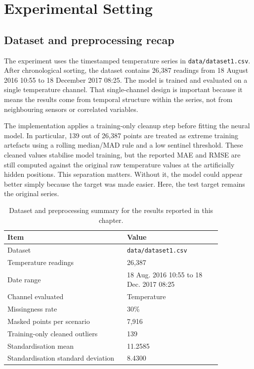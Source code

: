 \section{Experimental Setting}
\label{sec:results-setting}

\subsection{Dataset and preprocessing recap}

The experiment uses the timestamped temperature series in \texttt{data/dataset1.csv}. After chronological sorting, the dataset contains 26,387 readings from 18 August 2016 10:55 to 18 December 2017 08:25. The model is trained and evaluated on a single temperature channel. That single-channel design is important because it means the results come from temporal structure within the series, not from neighbouring sensors or correlated variables.

The implementation applies a training-only cleanup step before fitting the neural model. In particular, 139 out of 26,387 points are treated as extreme training artefacts using a rolling median/MAD rule and a low sentinel threshold. These cleaned values stabilise model training, but the reported MAE and RMSE are still computed against the original raw temperature values at the artificially hidden positions. This separation matters. Without it, the model could appear better simply because the target was made easier. Here, the test target remains the original series.

\begin{table}[ht]
	\centering
	\small
	\begin{tabular}{p{0.48\linewidth}p{0.38\linewidth}}
		\toprule
		\textbf{Item} & \textbf{Value} \\
		\midrule
		Dataset & \texttt{data/dataset1.csv} \\
		Temperature readings & 26,387 \\
		Date range & 18 Aug. 2016 10:55 to 18 Dec. 2017 08:25 \\
		Channel evaluated & Temperature \\
		Missingness rate & 30\% \\
		Masked points per scenario & 7,916 \\
		Training-only cleaned outliers & 139 \\
		Standardisation mean & 11.2585 \\
		Standardisation standard deviation & 8.4300 \\
		\bottomrule
	\end{tabular}
	\caption{Dataset and preprocessing summary for the results reported in this chapter.}
	\label{tab:results-dataset-summary}
\end{table}

